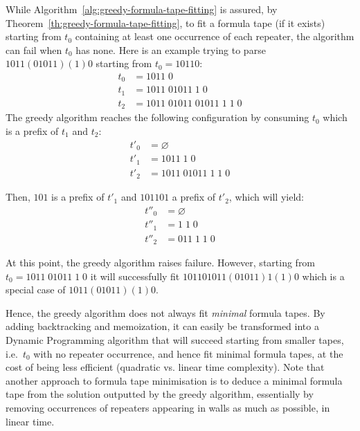 \begin{remark}
    While Algorithm~\ref{alg:greedy-formula-tape-fitting} is assured, by Theorem~\ref{th:greedy-formula-tape-fitting},  to fit a formula tape (if it exists) starting from $t_0$ containing at least one occurrence of each repeater, the algorithm can fail when $t_0$ has none. Here is an example trying to parse $1011(01011)(1)0$ starting from $t_0 = 10110$:
    \begin{align*}
        t_0 & = 1011\; 0                         \\
        t_1 & = 1011\; 01011\; 1\; 0             \\
        t_2 & = 1011\; 01011\; 01011\; 1\; 1\; 0
    \end{align*}
    The greedy algorithm reaches the following configuration by consuming $t_0$ which is a prefix of $t_1$ and $t_2$:
    \begin{align*}
        t'_0 & = \varnothing              \\
        t'_1 & = 1011\; 1\; 0             \\
        t'_2 & = 1011\; 01011\; 1\; 1\; 0
    \end{align*}

    Then, $101$ is a prefix of $t'_1$ and $101 101$ a prefix of $t'_2$, which will yield:
    \begin{align*}
        t''_0 & = \varnothing     \\
        t''_1 & = 1\; 1\; 0       \\
        t''_2 & = 011\; 1\; 1\; 0
    \end{align*}

    At this point, the greedy algorithm raises failure. However, starting from $t_0 = 1011\; 01011\; 1\; 0$ it will successfully fit $101101011(01011)1(1)0$ which is a special case of $1011(01011)(1)0$.

    Hence, the greedy algorithm does not always fit \textit{minimal} formula tapes. By adding backtracking and memoization, it can easily be transformed into a Dynamic Programming algorithm that will succeed starting from smaller tapes, i.e.\ $t_0$ with no repeater occurrence, and hence fit minimal formula tapes, at the cost of being less efficient (quadratic vs. linear time complexity).
    Note that another approach to formula tape minimisation is to deduce a minimal formula tape from the solution outputted by the greedy algorithm, essentially by removing occurrences of repeaters appearing in walls as much as possible, in linear time.

\end{remark}

